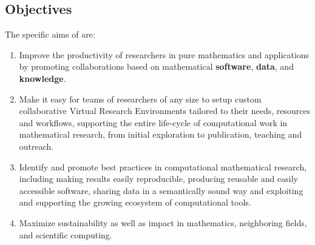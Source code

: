\documentclass[noworkareas,deliverables,keys]{euproposal}                  %
\begin{document}
\begin{proposal}


\subsection{Objectives}
\label{sect:objectives}


The specific aims of \TheProject are:


\begin{enumerate}
\item \label{aim:collaboration} Improve the productivity of
  researchers in pure mathematics and applications by promoting
  collaborations based on mathematical \textbf{software},
  \textbf{data}, and \textbf{knowledge}.
\item \label{aim:vre} Make it easy for teams of
  researchers of any size to setup custom collaborative Virtual Research
  Environments tailored to their needs, resources and workflows, supporting the
  entire life-cycle of computational work in mathematical research,
  from initial exploration to publication, teaching and outreach.
\item \label{aim:sharing} Identify and promote best practices in
  computational mathematical research, including making results easily
  reproducible, producing reusable and easily accessible
  software, sharing data in a semantically sound way and exploiting and
  supporting the growing ecosystem of computational tools.
\item \label{aim:impact} Maximize sustainability as well as impact in
  mathematics, neighboring fields, and scientific computing.

\end{enumerate}




\end{proposal}
\end{document}
